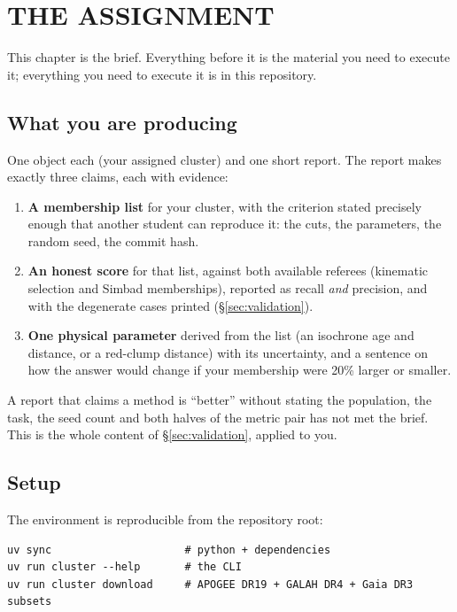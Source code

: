 \section{THE ASSIGNMENT}
\label{sec:assignment}


This chapter is the brief. Everything before it is the material you need to
execute it; everything you need to execute it is in this repository.

\subsection{What you are producing}

One object each (your assigned cluster) and one short report. The report makes
exactly three claims, each with evidence:

\begin{enumerate}
\item \textbf{A membership list} for your cluster, with the criterion stated
  precisely enough that another student can reproduce it: the cuts, the
  parameters, the random seed, the commit hash.
\item \textbf{An honest score} for that list, against both available referees
  (kinematic selection and Simbad memberships), reported as recall
  \emph{and} precision, and with the degenerate cases printed
  (\S\ref{sec:validation}).
\item \textbf{One physical parameter} derived from the list (an isochrone age
and distance, or a red-clump distance) with its uncertainty, and a sentence on
how the answer would change if your membership were 20\% larger or smaller.
\end{enumerate}

A report that claims a method is ``better'' without stating the population,
the task, the seed count and both halves of the metric pair has not met the
brief. This is the whole content of \S\ref{sec:validation}, applied to you.

\subsection{Setup}

The environment is reproducible from the repository root:

\begin{verbatim}
uv sync                     # python + dependencies
uv run cluster --help       # the CLI
uv run cluster download     # APOGEE DR19 + GALAH DR4 + Gaia DR3 subsets
\end{verbatim}


